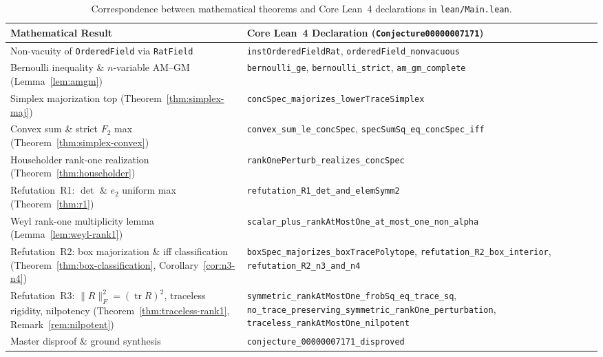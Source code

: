 \documentclass[11pt]{article}
\theoremstyle{definition}
\theoremstyle{remark}
\newcommand{\tr}{\operatorname{tr}}
\begin{document}
\begin{table}[htbp]
\centering
\caption{Correspondence between mathematical theorems and Core Lean~4 declarations in \texttt{lean/Main.lean}.}
\label{tab:lean-map}
\footnotesize
\begin{tabular}{@{}>{\raggedright\arraybackslash}p{}>{\raggedright\arraybackslash}p{}@{}}
\toprule
\textbf{Mathematical Result} & \textbf{Core Lean~4 Declaration (\texttt{Conjecture00000007171})} \\
\midrule
Non-vacuity of \texttt{OrderedField} via \texttt{RatField} & \texttt{instOrderedFieldRat}, \texttt{orderedField\_nonvacuous} \\
Bernoulli inequality \& $n$-variable AM--GM (Lemma~\ref{lem:amgm}) & \texttt{bernoulli\_ge}, \texttt{bernoulli\_strict}, \texttt{am\_gm\_complete} \\
Simplex majorization top (Theorem~\ref{thm:simplex-maj}) & \texttt{concSpec\_majorizes\_lowerTraceSimplex} \\
Convex sum \& strict $F_2$ max (Theorem~\ref{thm:simplex-convex}) & \texttt{convex\_sum\_le\_concSpec}, \texttt{specSumSq\_eq\_concSpec\_iff} \\
Householder rank-one realization (Theorem~\ref{thm:householder}) & \texttt{rankOnePerturb\_realizes\_concSpec} \\
Refutation~R1: $\det$ \& $e_2$ uniform max (Theorem~\ref{thm:r1}) & \texttt{refutation\_R1\_det\_and\_elemSymm2} \\
Weyl rank-one multiplicity lemma (Lemma~\ref{lem:weyl-rank1}) & \texttt{scalar\_plus\_rankAtMostOne\_at\_most\_one\_non\_alpha} \\
Refutation~R2: box majorization \& iff classification (Theorem~\ref{thm:box-classification}, Corollary~\ref{cor:n3-n4}) & \texttt{boxSpec\_majorizes\_boxTracePolytope}, \texttt{refutation\_R2\_box\_interior}, \texttt{refutation\_R2\_n3\_and\_n4} \\
Refutation~R3: $\|R\|_F^2 = (\tr R)^2$, traceless rigidity, nilpotency (Theorem~\ref{thm:traceless-rank1}, Remark~\ref{rem:nilpotent}) & \texttt{symmetric\_rankAtMostOne\_frobSq\_eq\_trace\_sq}, \texttt{no\_trace\_preserving\_symmetric\_rankOne\_perturbation}, \texttt{traceless\_rankAtMostOne\_nilpotent} \\
Master disproof \& ground synthesis & \texttt{conjecture\_00000007171\_disproved} \\
\bottomrule
\end{tabular}
\end{table}
\end{document}
